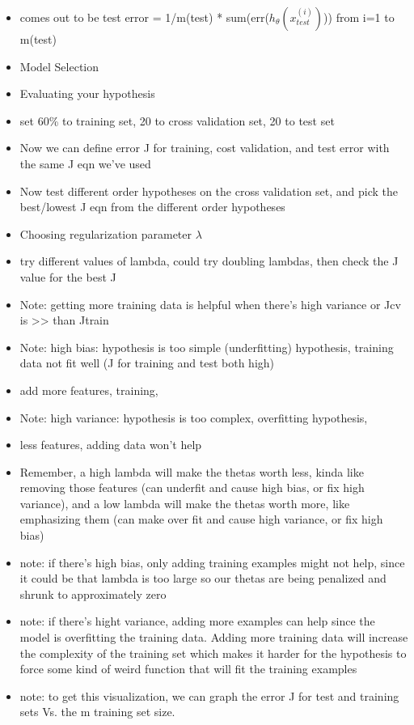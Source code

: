 \documentclass[]{article}
\begin{document}
\begin{itemize}
			\item comes out to be test error = 1/m(test) * sum(err($h_\theta(x_{test}^{(i)})$)) from i=1 to m(test)
			\\
			\item Model Selection
			\item Evaluating your hypothesis
			\item set 60\% to training set, 20 to cross validation set, 20 to test set
			\item Now we can define error J for training, cost validation, and test error with the same J eqn we've used
			\item Now test different order hypotheses on the cross validation set, and pick the best/lowest J eqn from the different order hypotheses
			\\
			\item Choosing regularization parameter $\lambda$
			\item try different values of lambda, could try doubling lambdas, then check the J value for the best J
			\item Note: getting more training data is helpful when there's high variance or Jcv is >> than Jtrain
			\\
			\item Note: high bias: hypothesis is too simple (underfitting) hypothesis, training data not fit well (J for training and test both high)
			\item add more features, training, 
			\item Note: high variance: hypothesis is too complex, overfitting hypothesis,
			\item less features, adding data won't help
			\\
			\item Remember, a high lambda will make the thetas worth less, kinda like removing those features (can underfit and cause high bias, or fix high variance), and a low lambda will make the thetas worth more, like emphasizing them (can make over fit and cause high variance, or fix high bias)
			\item note: if there's high bias, only adding training examples might not help, since it could be that lambda is too large so our thetas are being penalized and shrunk to approximately zero
			\item note: if there's hight variance, adding more examples can help since the model is overfitting the training data. Adding more training data will increase the complexity of the training set which makes it harder for the hypothesis to force some kind of weird function that will fit the training examples
			\item note: to get this visualization, we can graph the error J for test and training sets Vs. the m training set size.
		\end{itemize}
	
\end{document}
